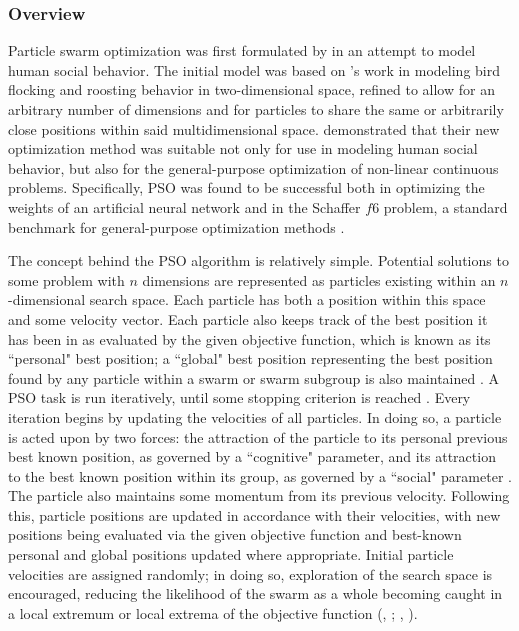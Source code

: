 \documentclass[11pt]{article}
\begin{document}
\subsubsection{Overview}
Particle swarm optimization was first formulated by \cite{kennedy1995} in an attempt to model human social behavior. The initial model was based on \cite{heppner1990}'s work in modeling bird flocking and roosting behavior in two-dimensional space, refined to allow for an arbitrary number of dimensions and for particles to share the same or arbitrarily close positions within said multidimensional space. \citeauthor{kennedy1995} demonstrated that their new optimization method was suitable not only for use in modeling human social behavior, but also for the general-purpose optimization of non-linear continuous problems. Specifically, PSO was found to be successful both in optimizing the weights of an artificial neural network and in the Schaffer $f6$ problem, a standard benchmark for general-purpose optimization methods \citep{davis1991}.

The concept behind the PSO algorithm is relatively simple. Potential solutions to some problem with $n$ dimensions are represented as particles existing within an $n$-dimensional search space. Each particle has both a position within this space and some velocity vector. Each particle also keeps track of the best position it has been in as evaluated by the given objective function, which is known as its ``personal" best position; a ``global" best position representing the best position found by any particle within a swarm or swarm subgroup is also maintained \citep{chong2013}. A PSO task is run iteratively, until some stopping criterion is reached \citep{solnon2010}. Every iteration begins by updating the velocities of all particles. In doing so, a particle is acted upon by two forces: the attraction of the particle to its personal previous best known position, as governed by a ``cognitive" parameter, and its attraction to the best known position within its group, as governed by a ``social" parameter \citep{chong2013}. The particle also maintains some momentum from its previous velocity. Following this, particle positions are updated in accordance with their velocities, with new positions being evaluated via the given objective function and best-known personal and global positions updated where appropriate. Initial particle velocities are assigned randomly; in doing so, exploration of the search space is encouraged, reducing the likelihood of the swarm as a whole becoming caught in a local extremum or local extrema of the objective function (\citeauthor{yang2014}, \citeyear{yang2014}; \citeauthor{solnon2010}, \citeyear{solnon2010}). 
\end{document}
